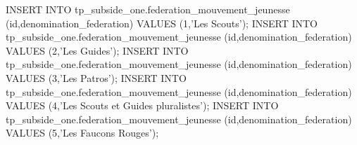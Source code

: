 
INSERT INTO tp_subside_one.federation_mouvement_jeunesse (id,denomination_federation)
	VALUES (1,'Les Scouts');
INSERT INTO tp_subside_one.federation_mouvement_jeunesse (id,denomination_federation)
	VALUES (2,'Les Guides');
INSERT INTO tp_subside_one.federation_mouvement_jeunesse (id,denomination_federation)
	VALUES (3,'Les Patros');
INSERT INTO tp_subside_one.federation_mouvement_jeunesse (id,denomination_federation)
	VALUES (4,'Les Scouts et Guides pluralistes');
INSERT INTO tp_subside_one.federation_mouvement_jeunesse (id,denomination_federation)
	VALUES (5,'Les Faucons Rouges');

